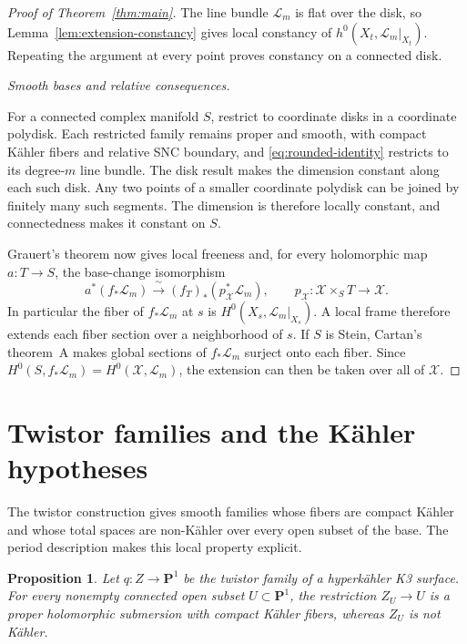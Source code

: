 \documentclass[11pt,a4paper]{article}
\numberwithin{equation}{section}
\newtheorem{proposition}[theorem]{Proposition}
\theoremstyle{definition}
\theoremstyle{remark}
\newcommand{\PP}{\mathbf P}\newcommand{\HH}{\mathbb H}
\begin{document}
\begin{proof}[Proof of Theorem~\ref{thm:main}]
The line bundle $\mathcal L_m$ is flat over the disk, so
Lemma~\ref{lem:extension-constancy} gives local constancy of
$h^0(X_t,\mathcal L_m|_{X_t})$. Repeating the argument at every
point proves constancy on a connected disk.

\smallskip\noindent\emph{Smooth bases and relative consequences.}

For a connected complex manifold $S$, restrict to coordinate disks
in a coordinate polydisk. Each restricted family remains proper and
smooth, with compact Kähler fibers and relative SNC boundary, and
\eqref{eq:rounded-identity} restricts to its degree-$m$ line bundle.
The disk result makes the dimension constant along each such disk.
Any two points of a smaller coordinate polydisk can be joined by
finitely many such segments. The dimension is therefore locally
constant, and connectedness makes it constant on $S$.

Grauert's theorem \cite{Grauert1960} now gives local freeness and,
for every holomorphic map $a:T\to S$, the base-change isomorphism
\begin{equation}\label{eq:all-base-change}
 a^*(f_*\mathcal L_m)
 \xrightarrow{\ \sim\ }
 (f_T)_*(p_{\mathcal X}^*\mathcal L_m),
 \qquad
 p_{\mathcal X}:\mathcal X\times_ST\to\mathcal X.
\end{equation}
In particular the fiber of $f_*\mathcal L_m$ at $s$ is
$H^0(X_s,\mathcal L_m|_{X_s})$. A local frame therefore extends
each fiber section over a neighborhood of $s$.
If $S$ is Stein, Cartan's theorem~A makes global sections of
$f_*\mathcal L_m$ surject onto each fiber. Since
$H^0(S,f_*\mathcal L_m)=H^0(\mathcal X,\mathcal L_m)$,
the extension can then be taken over all of $\mathcal X$.
\end{proof}

\section{Twistor families and the Kähler hypotheses}
\label{sec:example}

The twistor construction gives smooth families whose fibers are compact
Kähler and whose total spaces are non-Kähler over every open subset
of the base. The period description makes this local property explicit.

\begin{proposition}\label{prop:twistor-local}
Let $q:Z\to\PP^1$ be the twistor family of a hyperkähler K3 surface.
For every nonempty connected open subset $U\subset\PP^1$, the
restriction $Z_U\to U$ is a proper holomorphic submersion with
compact Kähler fibers, whereas $Z_U$ is not Kähler.
\end{proposition}
\end{document}
